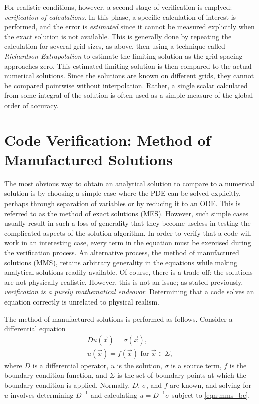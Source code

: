 For realistic conditions, however, a second stage of verification is emplyed: \textit{verification of calculations}.
In this phase, a specific calculation of interest is performed, and the error is \textit{estimated} since it cannot be measured explicitly when the exact solution is not available.
This is generally done by repeating the calculation for several grid sizes, as above, then using a technique called \textit{Richardson Extrapolation} to estimate the limiting solution as the grid spacing approaches zero.
This estimated limiting solution is then compared to the actual numerical solutions.
Since the solutions are known on different grids, they cannot be compared pointwise without interpolation.
Rather, a single scalar calculated from some integral of the solution is often used as a simple measure of the global order of accuracy. %

\section{Code Verification: Method of Manufactured Solutions}

The most obvious way to obtain an analytical solution to compare to a numerical solution is by choosing a simple case where the PDE can be solved explicitly, perhaps through separation of variables or by reducing it to an ODE.
This is referred to as the method of exact solutions (MES).
However, such simple cases usually result in such a loss of generality that they become useless in testing the complicated aspects of the solution algorithm.
In order to verify that a code will work in an interesting case, every term in the equation must be exercised during the verification process.
An alternative process, the method of manufactured solutions (MMS), retains arbitrary generality in the equations while making analytical solutions readily available.
Of course, there is a trade-off: the solutions are not physically realistic.
However, this is not an issue; as stated previously, \textit{verification is a purely mathematical endeavor}.
Determining that a code solves an equation correctly is unrelated to physical realism.

The method of manufactured solutions is performed as follows.
Consider a differential equation
\begin{align}
  Du(\vec{x}) = \sigma(\vec{x}), \label{eqn:mms_de} \\
  u(\vec{x})=f(\vec{x}) \mbox{ for } \vec{x} \in \Sigma,
  \label{eqn:mms_bc}
\end{align}
where $D$ is a differential operator, $u$ is the solution, $\sigma$ is a source term, $f$ is the boundary condition function, and $\Sigma$ is the set of boundary points at which the boundary condition is applied.
Normally, $D$, $\sigma$, and $f$ are known, and solving for $u$ involves determining $D^{-1}$ and calculating $u = D^{-1}\sigma$ subject to \eqref{eqn:mms_bc}.


